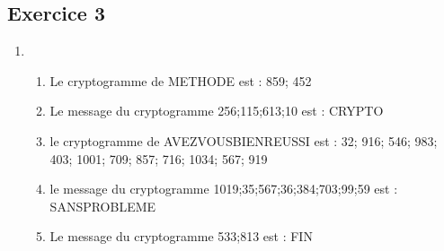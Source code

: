 \documentclass[titlepage]{article}
\begin{document}
\subsection{Exercice 3}
\begin{enumerate}
    \item \begin{enumerate}
    \item Le cryptogramme de METHODE est : 859; 452
    \item Le message du cryptogramme 256;115;613;10 est : CRYPTO
    \item le cryptogramme de AVEZVOUSBIENREUSSI est : 32; 916; 546; 983; 403; 1001; 709; 857; 716; 1034; 567; 919
    \item le message du cryptogramme 1019;35;567;36;384;703;99;59 est : SANSPROBLEME
    \item Le message du cryptogramme 533;813 est : FIN
    \end{enumerate}
\end{enumerate}
\end{document}

